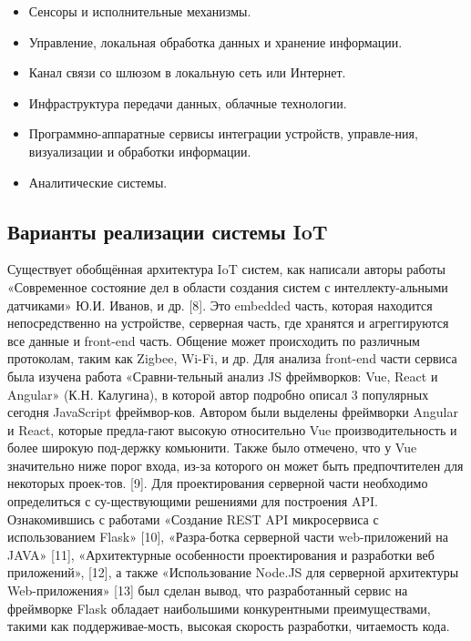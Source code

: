 \begin{itemize}
    \item Сенсоры и исполнительные механизмы.
    \item Управление, локальная обработка данных и хранение информации.
    \item Канал связи со шлюзом в локальную сеть или Интернет. 
    \item Инфраструктура передачи данных, облачные технологии. 
    \item Программно-аппаратные сервисы интеграции устройств, управле-ния, визуализации и обработки информации.
    \item Аналитические системы.
\end{itemize}


\subsection{Варианты реализации системы IoT}

Существует обобщённая архитектура IoT систем, как написали авторы работы «Современное состояние дел в области создания систем с интеллекту-альными датчиками» Ю.И. Иванов, и др. [8]. Это embedded часть, которая находится непосредственно на устройстве, серверная часть, где хранятся и агреггируются все данные и front-end часть.  Общение может происходить по различным протоколам, таким как Zigbee, Wi-Fi, и др.
Для анализа front-end части сервиса была изучена работа «Сравни-тельный анализ JS фреймворков: Vue, React и Angular» (К.Н. Калугина), в которой автор подробно описал 3 популярных сегодня JavaScript фреймвор-ков. Автором были выделены фреймворки Angular и React, которые предла-гают высокую относительно Vue производительность и более широкую под-держку комьюнити. Также было отмечено, что у Vue значительно ниже порог входа, из-за которого он может быть предпочтителен для некоторых проек-тов. [9].
Для проектирования серверной части необходимо определиться с су-ществующими решениями для построения API. Ознакомившись с работами «Создание REST API микросервиса с использованием Flask» [10], «Разра-ботка серверной части web-приложений на JAVA» [11], «Архитектурные особенности проектирования и разработки веб приложений», [12], а также «Использование Node.JS для серверной архитектуры Web-приложения» [13] был сделан вывод, что разработанный сервис на фреймворке Flask обладает наибольшими конкурентными преимуществами, такими как поддерживае-мость, высокая скорость разработки, читаемость кода.


\clearpage

